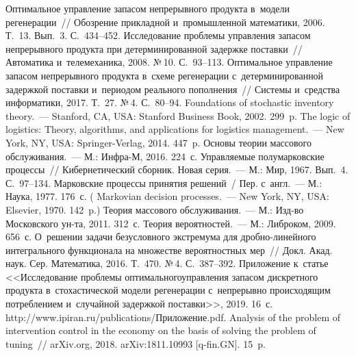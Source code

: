 \begin{multicols}{2}
  {\small\frenchspacing
 {%
 \begin{thebibliography}{99}
 Оптимальное управление запасом непрерывного 
продукта в~модели регенерации~// Обозрение прикладной и~промышленной математики, 
2006. Т.~13. Вып.~3. С.~434--452.
 Исследование проблемы управления запасом 
непрерывного продукта при детерминированной задержке поставки~// Автоматика 
и~телемеханика, 2008. №\,10. С.~93--113.
 Оптимальное управ\-ле\-ние запасом непрерывного 
продукта в~схеме регенерации с~детерминированной задержкой по\-став\-ки и~периодом 
реального пополнения~// Системы и~средства информатики, 2017. Т.~27. №\,4. С.~80--94.
 Foundations of stochastic inventory theory.~--- 
Stanford, CA, USA: Stanford Business Book, 2002. 299~p.
 The logic of logistics: Theory, algorithms, and 
applications for logistics management.~--- New York, NY, USA: Springer-Verlag, 2014. 447~p.
 Основы теории массового обслуживания.~--- М.: Инфра-М, 
2016. 224~с. 
 Управляемые полумарковские процессы~// Кибернетический сборник. 
Новая серия.~--- М.: Мир, 1967. Вып.~4. С.~97--134.
 Марковские процессы принятия решений~/ Пер. с~англ.~--- 
  М.: Наука,  1977. 176~с. ( Markovian decision processes.~---  
  New York, NY, USA: Elsevier, 1970. 142~p.)
 Теория массового обслуживания.~--- М.: Изд-во Московского ун-та, 2011. 
312~с.
 Теория вероятностей.~--- М.: Либроком, 2009. 656~с.
 О~решении задачи безусловного экстремума для дробно-линейного 
интегрального функционала на множестве вероятностных мер~// Докл. Акад. наук. Сер. 
Математика, 2016. Т.~470. №\,4. С.~387--392.
 Приложение к~статье <<Исследование проблемы 
оптимального\linebreak управления запасом дискретного продукта в~стохастической модели 
регенерации с~непрерывно происходящим потреблением и~случайной задержкой поставки>>, 
2019. 16~с. {\sf http://www.ipiran.ru/\linebreak publications/Приложение.pdf}.
Analysis of the problem of intervention control in the 
economy on the basis of solving the problem of tuning~// arXiv.org, 2018. 
arXiv:1811.10993 [q-fin.GN]. 15~p.
 \end{thebibliography}

 }
 }

\end{multicols}

